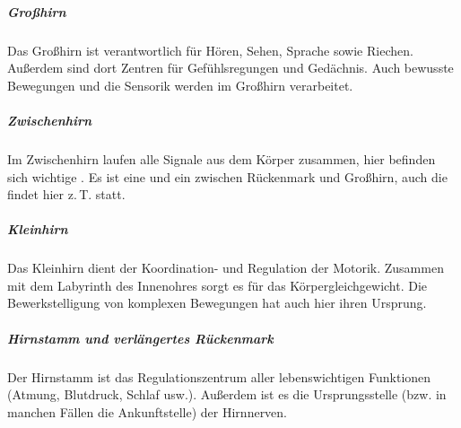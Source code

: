 %
{%
\subparagraph{Großhirn}
%
Das Großhirn ist verantwortlich für Hören, Sehen, Sprache
sowie Riechen.
Außerdem sind dort Zentren für Gefühlsregungen und
Gedächnis. Auch bewusste Bewegungen und die Sensorik werden
im Großhirn verarbeitet.


\subparagraph{Zwischenhirn}
%
Im  Zwischenhirn laufen alle Signale aus dem Körper
zusammen, hier befinden sich wichtige
. Es ist eine  und ein 
zwischen Rückenmark und Großhirn, auch die  findet hier z.\,T. statt.

\subparagraph{Kleinhirn}
%
Das Kleinhirn dient der Koordination- und Regulation der
Motorik. Zusammen mit dem Labyrinth des Innenohres sorgt es
für das Körpergleichgewicht. Die Bewerkstelligung von
komplexen Bewegungen hat auch hier ihren Ursprung.

\subparagraph{Hirnstamm und verlängertes Rückenmark}
%
%
Der Hirnstamm ist das Regulationszentrum aller
lebenswichtigen Funktionen (Atmung, Blutdruck, Schlaf usw.).
Außerdem ist es die Ursprungsstelle (bzw. in manchen Fällen
die Ankunftstelle) der Hirnnerven.


}
